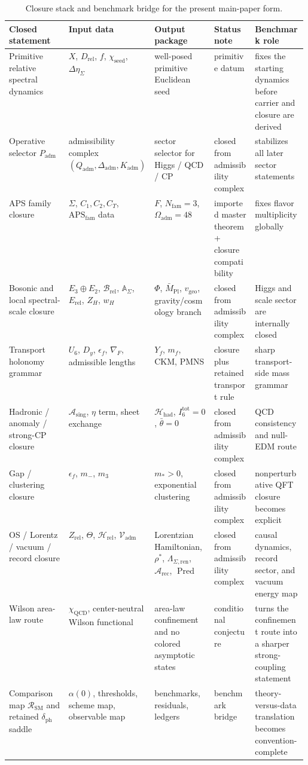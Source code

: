 \documentclass[11pt,a4paper]{article}
\theoremstyle{definition}
\theoremstyle{remark}
\newcommand{\Seam}{\Sigma}
\newcommand{\Mpl}{\bar M_{\mathrm{Pl}}}
\newcommand{\SM}{\mathrm{SM}}
\newcommand{\QCD}{\mathrm{QCD}}
\newcommand{\Oadm}{\Omega_{\mathrm{adm}}}
\newcommand{\Arec}{\mathcal A_{\mathrm{rec}}}
\newcommand{\Asing}{\mathcal A_{\mathrm{sing}}}
\newcommand{\Vadm}{\mathcal V_{\mathrm{adm}}}
\newcommand{\Hrel}{\mathcal H_{\mathrm{rel}}}
\newcommand{\Hhad}{\mathcal H_{\mathrm{had}}}
\newcommand{\Pred}{\operatorname{Pred}}
\newcommand{\Kadm}{K_{\mathrm{adm}}}
\newcommand{\chiseed}{\chi_{\mathrm{seed}}}
\newcommand{\APSfam}{\mathrm{APS}_{\mathrm{fam}}}
\newcommand{\vgeo}{v_{\mathrm{geo}}}
\newcommand{\Padm}{P_{\mathrm{adm}}}
\begin{document}
\begin{table}[t]
\centering
\small
\begin{tabularx}{\linewidth}{@{}>{\raggedright\arraybackslash}p{0.20\linewidth}>{\raggedright\arraybackslash}p{0.18\linewidth}>{\raggedright\arraybackslash}p{0.20\linewidth}YY@{}}
\toprule
Closed statement & Input data & Output package & Status note & Benchmark role \\
\midrule
Primitive relative spectral dynamics & $X$, $D_{\mathrm{rel}}$, $f$, $\chiseed$, $\Delta\eta_\Sigma$ & well-posed primitive Euclidean seed & primitive datum & fixes the starting dynamics before carrier and closure are derived \\
Operative selector $\Padm$ & admissibility complex $(Q_{\mathrm{adm}},\Delta_{\mathrm{adm}},\Kadm)$ & sector selector for Higgs / QCD / CP & closed from admissibility complex & stabilizes all later sector statements \\
APS family closure & $\Seam$, $C_1,C_2,C_T$, $\APSfam$ data & $F$, $N_{\mathrm{fam}}=3$, $\Oadm=48$ & imported master theorem + closure compatibility & fixes flavor multiplicity globally \\
Bosonic and local spectral-scale closure & $E_3\oplus E_2$, $\mathcal B_{\mathrm{rel}}$, $\mathbb A_{\Seam}$, $E_{\mathrm{rel}}$, $Z_H$, $w_H$ & $\Phi$, $\Mpl$, $\vgeo$, gravity/cosmology branch & closed from admissibility complex & Higgs and scale sector are internally closed \\
Transport holonomy grammar & $U_6$, $D_y$, $\epsilon_f$, $\nabla_F$, admissible lengths & $Y_f$, $m_f$, CKM, PMNS & closure plus retained transport rule & sharp transport-side mass grammar \\
Hadronic / anomaly / strong-CP closure & $\Asing$, $\eta$ term, sheet exchange & $\Hhad$, $I_6^{\mathrm{tot}}=0$, $\bar\theta=0$ & closed from admissibility complex & QCD consistency and null-EDM route \\
Gap / clustering closure & $\epsilon_f$, $m_-$, $m_3$ & $m_*>0$, exponential clustering & closed from admissibility complex & nonperturbative QFT closure becomes explicit \\
OS / Lorentz / vacuum / record closure & $Z_{\mathrm{rel}}$, $\Theta$, $\Hrel$, $\Vadm$ & Lorentzian Hamiltonian, $\rho^\ast$, $\Lambda_{\Seam,\mathrm{ren}}$, $\Arec$, $\Pred$ & closed from admissibility complex & causal dynamics, record sector, and vacuum energy map \\
Wilson area-law route & $\chi_{\QCD}$, center-neutral Wilson functional & area-law confinement and no colored asymptotic states & conditional conjecture & turns the confinement route into a sharper strong-coupling statement \\
Comparison map $\mathcal R_{\SM}$ and retained $\delta_{\mathrm{ph}}$ saddle & $\alpha(0)$, thresholds, scheme map, observable map & benchmarks, residuals, ledgers & benchmark bridge & theory-versus-data translation becomes convention-complete \\
\bottomrule
\end{tabularx}
\caption{Closure stack and benchmark bridge for the present main-paper form.}
\label{tab:proof-obligations}
\end{table}
\end{document}
